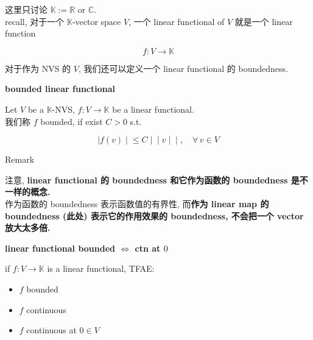 \documentclass{qlnotes-export}
\begin{document}
这里只讨论 \({\mathbb{K}} := {\mathbb{R}}\) or \(\mathbb{C}\).\\
recall, 对于一个 \(\mathbb{K}\)-vector space \(V\), 一个 linear functional of \(V\) 就是一个 linear function

\[f:V\rightarrow{\mathbb{K}}\]

对于作为 NVS 的 \(V\), 我们还可以定义一个 linear functional 的 boundedness.

\begin{definition}{\protect{}\label{kn-bounded-linear-functional}{\textbf{bounded
linear functional}}}

Let \(V\) be a \(\mathbb{K}\)-NVS, \(f:V\rightarrow{\mathbb{K}}\) be a linear functional.\\
我们称 \(f\) bounded, if exist \(C > 0\) s.t.

\[\left. |f(v) \middle| \leq C \middle| \middle| v \middle| \middle| ,\quad\forall\, v \in V \right.\]

\end{definition}

\begin{qlremark}{Remark}

注意, \textbf{linear functional 的 boundedness 和它作为函数的 boundedness 是不一样的概念.}\\
作为函数的 boundedness 表示函数值的有界性, 而\textbf{作为 linear map 的 boundedness (此处) 表示它的作用效果的 boundedness, 不会把一个 vector 放大太多倍.}

\end{qlremark}

\begin{proposition}{\protect{}\label{kn-linear-functional-bounded-iff-ctn-at-0}{\textbf{linear
functional bounded \(\Leftrightarrow\) ctn at \(0\)}}}

if \(f:V\rightarrow{\mathbb{K}}\) is a linear functional, TFAE:

\begin{itemize}
\item
  \(f\) bounded
\item
  \(f\) continuous
\item
  \(f\) continuous at \(0 \in V\)
\end{itemize}

\end{proposition}
\end{document}
